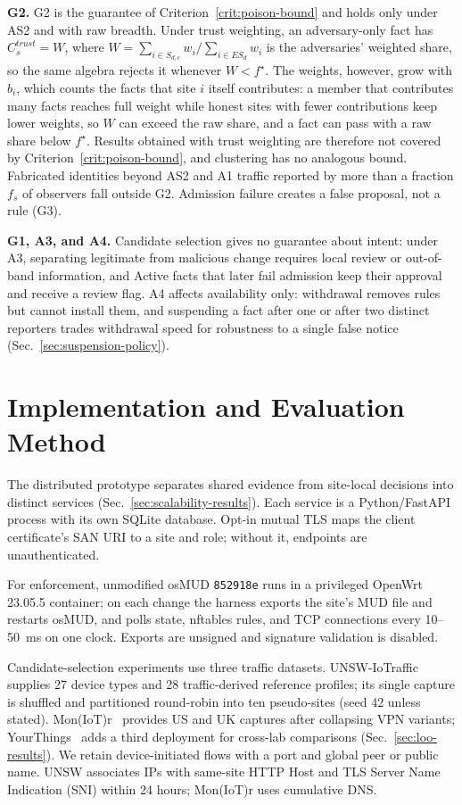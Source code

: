 \documentclass[journal]{IEEEtran}
\theoremstyle{definition}
\begin{document}
\textbf{G2.} G2 is the guarantee of Criterion~\ref{crit:poison-bound} and holds only under AS2 and with raw breadth. Under trust weighting, an adversary-only fact has $C_s^{trust}=W$, where $W=\sum_{i\in S_{d,e}}w_i/\sum_{i\in ES_d}w_i$ is the adversaries' weighted share, so the same algebra rejects it whenever $W<f^\star$. The weights, however, grow with $b_i$, which counts the facts that site $i$ itself contributes: a member that contributes many facts reaches full weight while honest sites with fewer contributions keep lower weights, so $W$ can exceed the raw share, and a fact can pass with a raw share below $f^\star$. Results obtained with trust weighting are therefore not covered by Criterion~\ref{crit:poison-bound}, and clustering has no analogous bound. Fabricated identities beyond AS2 and A1 traffic reported by more than a fraction $f_s$ of observers fall outside G2. Admission failure creates a false proposal, not a rule (G3).

\textbf{G1, A3, and A4.} Candidate selection gives no guarantee about intent: under A3, separating legitimate from malicious change requires local review or out-of-band information, and Active facts that later fail admission keep their approval and receive a review flag. A4 affects availability only: withdrawal removes rules but cannot install them, and suspending a fact after one or after two distinct reporters trades withdrawal speed for robustness to a single false notice (Sec.~\ref{sec:suspension-policy}).

\section{Implementation and Evaluation Method}
\label{sec:impl}
The distributed prototype separates shared evidence from site-local decisions into distinct services (Sec.~\ref{sec:scalability-results}). Each service is a Python/FastAPI process with its own SQLite database. Opt-in mutual TLS maps the client certificate's SAN URI to a site and role; without it, endpoints are unauthenticated.

For enforcement, unmodified osMUD \texttt{852918e} runs in a privileged OpenWrt 23.05.5 container; on each change the harness exports the site's MUD file and restarts osMUD, and polls state, nftables rules, and TCP connections every 10--50~ms on one clock. Exports are unsigned and signature validation is disabled.

Candidate-selection experiments use three traffic datasets. UNSW-IoTraffic~\cite{sivanathan2019classifying} supplies 27 device types and 28 traffic-derived reference profiles; its single capture is shuffled and partitioned round-robin into ten pseudo-sites (seed 42 unless stated). Mon(IoT)r~\cite{moniotr} provides US and UK captures after collapsing VPN variants; YourThings~\cite{alrawi2019yourthings} adds a third deployment for cross-lab comparisons (Sec.~\ref{sec:loo-results}). We retain device-initiated flows with a port and global peer or public name. UNSW associates IPs with same-site HTTP Host and TLS Server Name Indication (SNI) within 24 hours; Mon(IoT)r uses cumulative DNS.
\end{document}
